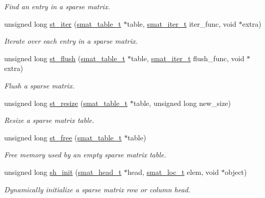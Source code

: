 \begin{CompactItemize}
\begin{CompactList}\small\item\em Find an entry in a sparse matrix. \item\end{CompactList}\item 
unsigned long \hyperlink{group__dbprim__smat_a13}{st\_\-iter} (\hyperlink{dbprim_8h_a0}{smat\_\-table\_\-t} $\ast$table, \hyperlink{dbprim_8h_a4}{smat\_\-iter\_\-t} iter\_\-func, void $\ast$extra)
\begin{CompactList}\small\item\em Iterate over each entry in a sparse matrix. \item\end{CompactList}\item 
unsigned long \hyperlink{group__dbprim__smat_a14}{st\_\-flush} (\hyperlink{dbprim_8h_a0}{smat\_\-table\_\-t} $\ast$table, \hyperlink{dbprim_8h_a4}{smat\_\-iter\_\-t} flush\_\-func, void $\ast$extra)
\begin{CompactList}\small\item\em Flush a sparse matrix. \item\end{CompactList}\item 
unsigned long \hyperlink{group__dbprim__smat_a15}{st\_\-resize} (\hyperlink{dbprim_8h_a0}{smat\_\-table\_\-t} $\ast$table, unsigned long new\_\-size)
\begin{CompactList}\small\item\em Resize a sparse matrix table. \item\end{CompactList}\item 
unsigned long \hyperlink{group__dbprim__smat_a16}{st\_\-free} (\hyperlink{dbprim_8h_a0}{smat\_\-table\_\-t} $\ast$table)
\begin{CompactList}\small\item\em Free memory used by an empty sparse matrix table. \item\end{CompactList}\item 
unsigned long \hyperlink{group__dbprim__smat_a17}{sh\_\-init} (\hyperlink{dbprim_8h_a1}{smat\_\-head\_\-t} $\ast$head, \hyperlink{dbprim_8h_a6}{smat\_\-loc\_\-t} elem, void $\ast$object)
\begin{CompactList}\small\item\em Dynamically initialize a sparse matrix row or column head. \item\end{CompactList}\item 

\end{CompactItemize}
